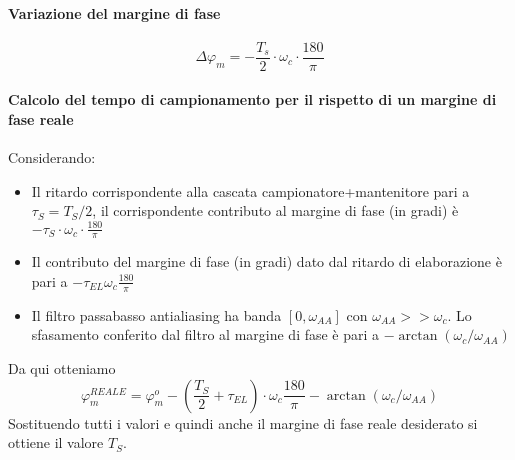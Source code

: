 \documentclass{article}
\begin{document}
	\paragraph{Variazione del margine di fase}
	\begin{equation}
		\Delta\varphi_m = -\frac{T_s}{2}\cdot\omega_c\cdot\frac{180}{\pi}
	\end{equation}
	\paragraph{Calcolo del tempo di campionamento per il rispetto di un margine di fase reale}
	Considerando:
	\begin{itemize}
		\item Il ritardo corrispondente alla cascata campionatore+mantenitore pari a $\tau_S = T_S/2$, il corrispondente contributo al margine di fase (in gradi) è $-\tau_S\cdot\omega_c\cdot\frac{180}{\pi}$
		\item Il contributo del margine di fase (in gradi) dato dal ritardo di elaborazione è pari a $-\tau_{EL}\omega_c\frac{180}{\pi}$
		\item Il filtro passabasso antialiasing ha banda $[0, \omega_{AA}]$ con $\omega_{AA}>>\omega_c$. Lo sfasamento conferito dal filtro al margine di fase è pari a $-\arctan(\omega_c/\omega_{AA})$
	\end{itemize}
	Da qui otteniamo
	\begin{equation}
		\varphi_m^{REALE} = \varphi_m^o - (\frac{T_S}{2} + \tau_{EL})\cdot\omega_c\frac{180}{\pi} - \arctan(\omega_c/\omega_{AA})
	\end{equation}
	Sostituendo tutti i valori e quindi anche il margine di fase reale desiderato si ottiene il valore $T_S$.
\end{document}
